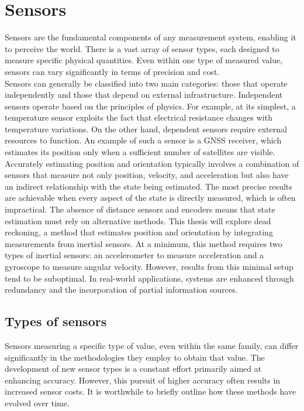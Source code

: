 \chapter{Sensors}

Sensors are the fundamental components of any measurement system, enabling it to perceive the world. There is a vast array of sensor types, each designed to measure specific physical quantities. Even within one type of measured value, sensors can vary significantly in terms of precision and cost. \\

Sensors can generally be classified into two main categories: those that operate independently and those that depend on external infrastructure. Independent sensors operate based on the principles of physics. For example, at its simplest, a temperature sensor exploits the fact that electrical resistance changes with temperature variations. On the other hand, dependent sensors require external resources to function. An example of such a sensor is a GNSS receiver, which estimates its position only when a sufficient number of satellites are visible.\\

Accurately estimating position and orientation typically involves a combination of sensors that measure not only position, velocity, and acceleration but also have an indirect relationship with the state being estimated. The most precise results are achievable when every aspect of the state is directly measured, which is often impractical. The absence of distance sensors and encoders means that state estimation must rely on alternative methods. This thesis will explore dead reckoning, a method that estimates position and orientation by integrating measurements from inertial sensors. At a minimum, this method requires two types of inertial sensors: an accelerometer to measure acceleration and a gyroscope to measure angular velocity. However, results from this minimal setup tend to be suboptimal. In real-world applications, systems are enhanced through redundancy and the incorporation of partial information sources.

\section{Types of sensors}

Sensors measuring a specific type of value, even within the same family, can differ significantly in the methodologies they employ to obtain that value. The development of new sensor types is a constant effort primarily aimed at enhancing accuracy. However, this pursuit of higher accuracy often results in increased sensor costs. It is worthwhile to briefly outline how these methods have evolved over time.\\

